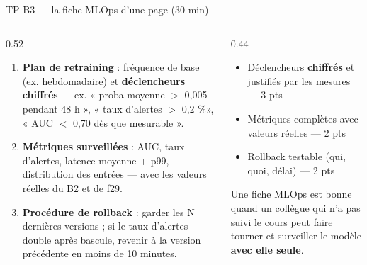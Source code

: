 \begin{frame}{TP B3 --- la fiche MLOps d'une page (30 min)}
\small
\begin{columns}[t]
\begin{column}{0.52\textwidth}
\small\begin{abox}
\begin{enumerate}
\item \textbf{Plan de retraining} : fréquence de base (ex. hebdomadaire) et
\textbf{déclencheurs chiffrés} --- ex. « proba moyenne $>$ 0,005 pendant
48 h », « taux d'alertes $>$ 0,2 \%», « AUC $<$ 0,70 dès que mesurable ».
\item \textbf{Métriques surveillées} : AUC, taux d'alertes, latence moyenne
+ p99, distribution des entrées --- avec les valeurs réelles du B2 et de f29.
\item \textbf{Procédure de rollback} : garder les N dernières versions ; si
le taux d'alertes double après bascule, revenir à la version précédente en
moins de 10 minutes.
\end{enumerate}
\end{abox}
\end{column}
\begin{column}{0.44\textwidth}
\small\begin{kbox}
\begin{itemize}
\item Déclencheurs \textbf{chiffrés} et justifiés par les mesures --- 3 pts
\item Métriques complètes avec valeurs réelles --- 2 pts
\item Rollback testable (qui, quoi, délai) --- 2 pts
\end{itemize}
\end{kbox}
\begin{wbox}
Une fiche MLOps est bonne quand un collègue qui n'a pas suivi le cours
peut faire tourner et surveiller le modèle \textbf{avec elle seule}.
\end{wbox}
\end{column}
\end{columns}
\end{frame}

